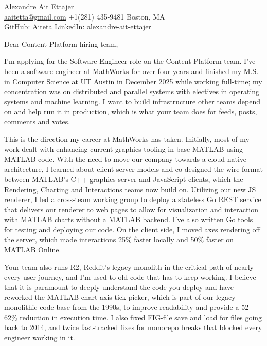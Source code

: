 \documentclass{article}
\begin{document}
\begin{flushleft}
    {\Large Alexandre Ait Ettajer} \\
    \href{mailto:aaitetta@gmail.com}{aaitetta@gmail.com} \quad +1(281) 435-9481 \quad Boston, MA \\
    GitHub: \href{https://github.com/aiteta}{Aiteta} \quad LinkedIn: \href{https://www.linkedin.com/in/alexandre-ait-ettajer-65740b170/}{alexandre-ait-ettajer} \\
\end{flushleft}

\vspace{1em}

Dear Content Platform hiring team,

I'm applying for the Software Engineer role on the Content Platform team. I've been a software engineer at MathWorks for over four years and finished my M.S. in Computer Science at UT Austin in December 2025 while working full-time; my concentration was on distributed and parallel systems with electives in operating systems and machine learning.
I want to build infrastructure other teams depend on and help run it in production, which is what your team does for feeds, posts, comments and votes.

This is the direction my career at MathWorks has taken.
Initially, most of my work dealt with enhancing current graphics tooling in base MATLAB using MATLAB code.
With the need to move our company towards a cloud native architecture, I learned about client-server models and co-designed the wire format between MATLAB's C++ graphics server and JavaScript clients, which the Rendering, Charting and Interactions teams now build on.
Utilizing our new JS renderer, I led a cross-team working group to deploy a stateless Go REST service that delivers our renderer to web pages to allow for visualization and interaction with MATLAB charts without a MATLAB backend.
I've also written Go tools for testing and deploying our code.
On the client side, I moved axes rendering off the server, which made interactions 25\% faster locally and 50\% faster on MATLAB Online.

Your team also runs R2, Reddit's legacy monolith in the critical path of nearly every user journey, and I'm used to old code that has to keep working.
I believe that it is paramount to deeply understand the code you deploy and have reworked the MATLAB chart axis tick picker, which is part of our legacy monolithic code base from the 1990s, to improve readability and provide a 52--62\% reduction in execution time.
I also fixed FIG-file save and load for files going back to 2014, and twice fast-tracked fixes for monorepo breaks that blocked every engineer working in it.
\end{document}
